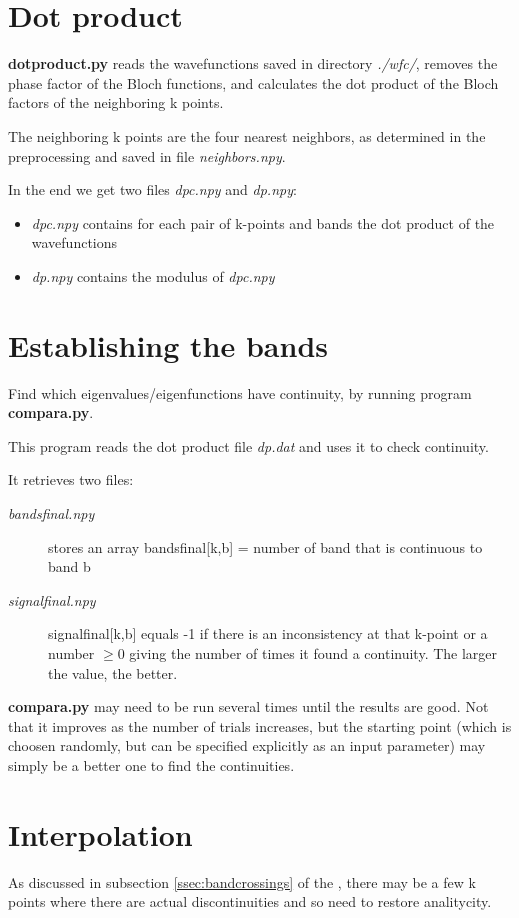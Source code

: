 \documentclass[a4paper,12pt]{report}
\begin{document}
\section{Dot product}

\textbf{dotproduct.py} reads the wavefunctions saved in directory \emph{./wfc/},
removes the phase factor of the Bloch functions, and calculates the dot product
of the Bloch factors of the neighboring k points.

The neighboring k points are the four nearest neighbors, as determined in the preprocessing
and saved in file \emph{neighbors.npy}.

In the end we get two files \emph{dpc.npy} and \emph{dp.npy}:
\begin{itemize}
 \item \emph{dpc.npy} contains for each pair of k-points and bands the dot product of the wavefunctions
 \item \emph{dp.npy} contains the modulus of \emph{dpc.npy}
\end{itemize}


\section{Establishing the bands}
Find which eigenvalues/eigenfunctions have continuity, by running program \textbf{compara.py}.

This program reads the dot product file \emph{dp.dat} and uses it to check continuity.

 It retrieves two files:
 \begin{description}
   \item[\emph{bandsfinal.npy}] stores an array bandsfinal[k,b] = number of band that is continuous to band b
   \item[\emph{signalfinal.npy}] signalfinal[k,b] equals -1 if there is an inconsistency at
   that k-point or a number $\ge0$
  giving the number of times it found a continuity. The larger the value, the better.
 \end{description}

 \textbf{compara.py} may need to be run several times until the results are good.
 Not that it improves as the number of trials increases, but the starting point
 (which is choosen randomly, but can be specified explicitly as an input parameter)
 may simply be a better one to find the continuities.


\section{Interpolation}
 As discussed in subsection \ref{ssec:bandcrossings} of the ,
 there may be a few k points where there are actual discontinuities and so need to restore analitycity.
\end{document}
